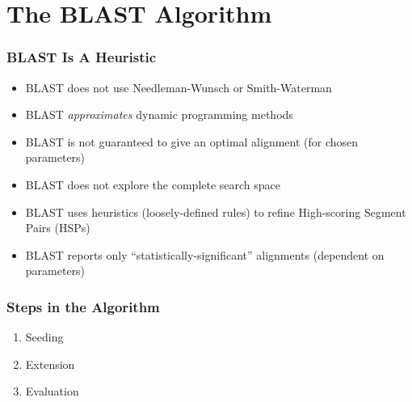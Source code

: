 \documentclass[table]{beamer}
\begin{document}
    \section{The BLAST Algorithm}
    \begin{frame}
     \frametitle{BLAST Is A Heuristic}
     \begin{itemize}
       \item<1-> BLAST does not use Needleman-Wunsch or Smith-Waterman
       \item<1-> BLAST \emph{approximates} dynamic programming methods
       \item<1-> BLAST is not guaranteed to give an optimal alignment (for chosen parameters)
       \item<2-> BLAST does not explore the complete search space
       \item<3-> BLAST uses heuristics (loosely-defined rules) to refine High-scoring Segment Pairs (HSPs)
       \item<4-> BLAST reports only ``statistically-significant'' alignments (dependent on parameters)
     \end{itemize}
   \end{frame}

  \begin{frame}
    \frametitle{Steps in the Algorithm}
    \begin{enumerate}
      \item Seeding
      \item Extension
      \item Evaluation
    \end{enumerate}
  \end{frame}

\end{document}
